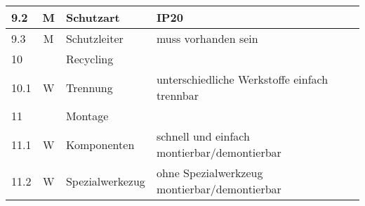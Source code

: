 \begin{longtable}[l]{|l|c|l|p{8.5cm}|}
	\hline 9.2 & M & Schutzart & IP20 \\
	\hline 9.3 & M & Schutzleiter & muss vorhanden sein \\
	\hline 10 &  & Recycling & \\
	\hline 10.1 & W & Trennung & unterschiedliche Werkstoffe einfach trennbar \\
	\hline 11 &  & Montage & \\
	\hline 11.1 & W & Komponenten & schnell und einfach montierbar/demontierbar \\
	\hline 11.2 & W & Spezialwerkezug & ohne Spezialwerkzeug montierbar/demontierbar \\
	\hline 
	
\end{longtable}